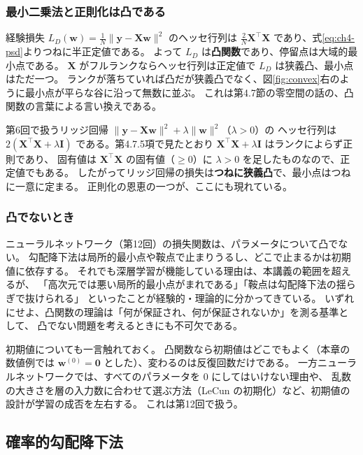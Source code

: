 \subsubsection{最小二乗法と正則化は凸である}

経験損失 $L_D(\bm{w}) = \frac{1}{N}\|\bm{y} - \bm{X}\bm{w}\|^2$ のヘッセ行列は
$\frac{2}{N}\bm{X}^\top\bm{X}$ であり、式\eqref{eq:ch4-psd}よりつねに半正定値である。
よって $L_D$ は\textbf{凸関数}であり、停留点は大域的最小点である。
$\bm{X}$ がフルランクならヘッセ行列は正定値で $L_D$ は狭義凸、最小点はただ一つ。
ランクが落ちていれば凸だが狭義凸でなく、図\ref{fig:convex}右のように最小点が平らな谷に沿って無数に並ぶ。
これは第4.7節の零空間の話の、凸関数の言葉による言い換えである。

第6回で扱うリッジ回帰 $\|\bm{y} - \bm{X}\bm{w}\|^2 + \lambda\|\bm{w}\|^2$（$\lambda > 0$）の
ヘッセ行列は $2(\bm{X}^\top\bm{X} + \lambda\bm{I})$ である。第4.7.5項で見たとおり $\bm{X}^\top\bm{X} + \lambda\bm{I}$ はランクによらず正則であり、
固有値は $\bm{X}^\top\bm{X}$ の固有値（$\geq 0$）に $\lambda > 0$ を足したものなので、正定値でもある。
したがってリッジ回帰の損失は\textbf{つねに狭義凸}で、最小点はつねに一意に定まる。
正則化の恩恵の一つが、ここにも現れている。

\subsubsection{凸でないとき}

ニューラルネットワーク（第12回）の損失関数は、パラメータについて凸でない。
勾配降下法は局所的最小点や鞍点で止まりうるし、どこで止まるかは初期値に依存する。
それでも深層学習が機能している理由は、本講義の範囲を超えるが、
「高次元では悪い局所的最小点がまれである」「鞍点は勾配降下法の揺らぎで抜けられる」
といったことが経験的・理論的に分かってきている。
いずれにせよ、凸関数の理論は「何が保証され、何が保証されないか」を測る基準として、
凸でない問題を考えるときにも不可欠である。

初期値についても一言触れておく。
凸関数なら初期値はどこでもよく（本章の数値例では $\bm{w}^{(0)} = \bm{0}$ とした）、変わるのは反復回数だけである。
一方ニューラルネットワークでは、すべてのパラメータを $0$ にしてはいけない理由や、
乱数の大きさを層の入力数に合わせて選ぶ方法（LeCun の初期化）など、初期値の設計が学習の成否を左右する。
これは第12回で扱う。


\subsection{確率的勾配降下法}

